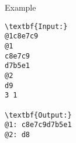 Example
\begin{verbatim}
\textbf{Input:}
@1c8e7c9
@1
c8e7c9
d7b5e1
@2
d9
3 1

\textbf{Output:}
@1: c8e7c9d7b5e1
@2: d8\end{verbatim}